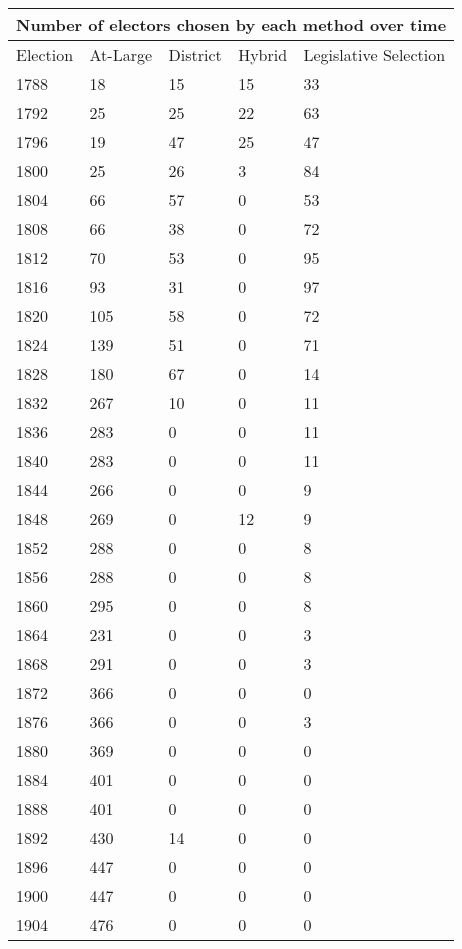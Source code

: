 \documentclass{article}
\begin{document}
    \begin{adjustbox}{center}
    \begin{tabular}{ |l|l|l|l|l| }
        \multicolumn{5}{|l|}{Number of electors chosen by each method over time} \\
        \hline
        Election & At-Large & District & Hybrid & Legislative Selection \\
        \hline
        1788 & 18 & 15 & 15 & 33 \\
        1792 & 25 & 25 & 22 & 63 \\
        1796 & 19 & 47 & 25 & 47 \\
        1800 & 25 & 26 & 3 & 84 \\
        1804 & 66 & 57 & 0 & 53 \\
        1808 & 66 & 38 & 0 & 72 \\
        1812 & 70 & 53 & 0 & 95 \\
        1816 & 93 & 31 & 0 & 97 \\
        1820 & 105 & 58 & 0 & 72 \\
        1824 & 139 & 51 & 0 & 71 \\
        1828 & 180 & 67 & 0 & 14 \\
        1832 & 267 & 10 & 0 & 11 \\
        1836 & 283 & 0 & 0 & 11 \\
        1840 & 283 & 0 & 0 & 11 \\
        1844 & 266 & 0 & 0 & 9 \\
        1848 & 269 & 0 & 12 & 9 \\
        1852 & 288 & 0 & 0 & 8 \\
        1856 & 288 & 0 & 0 & 8 \\
        1860 & 295 & 0 & 0 & 8 \\
        1864 & 231 & 0 & 0 & 3 \\
        1868 & 291 & 0 & 0 & 3 \\
        1872 & 366 & 0 & 0 & 0 \\
        1876 & 366 & 0 & 0 & 3 \\
        1880 & 369 & 0 & 0 & 0 \\
        1884 & 401 & 0 & 0 & 0 \\
        1888 & 401 & 0 & 0 & 0 \\
        1892 & 430 & 14 & 0 & 0 \\
        1896 & 447 & 0 & 0 & 0 \\
        1900 & 447 & 0 & 0 & 0 \\
        1904 & 476 & 0 & 0 & 0 \\
    \end{tabular}
    \end{adjustbox} \\
\end{document}

